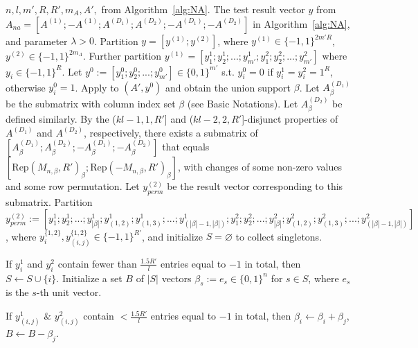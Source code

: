 \documentclass[10pt,a4paper]{amsart}
\begin{document}
\begin{algorithm}
\caption{Non-adaptive scheme of the MLC under Assumption~\ref{Assumption1}: Decoding algorithm}\label{alg:NAdec}
\begin{algorithmic}[1]
    \Require $n,l,m',R,R',m_A,A',$ from Algorithm~\ref{alg:NA}. The test result vector $y$ from $A_{na}=[A^{(1)};-A^{(1)};A^{(D_1)};A^{(D_2)};-A^{(D_1)};-A^{(D_2)}]$ in Algorithm~\ref{alg:NA}, and parameter $\lambda>0$.   
    \State Partition $y=[y^{(1)};y^{(2)}]$, where $y^{(1)}\in\{-1,1\}^{2m'R}$,  $y^{(2)}\in\{-1,1\}^{2m_A}$. Further partition $y^{(1)}=[y_1^1;y_2^1;...;y_{m'}^1;y_1^2;y_2^2;...;y_{m'}^2]$ where $y_i\in \{-1,1\}^R$. Let $y^0:=[y_1^0;y_2^0;...;y_{m'}^0]\in\{0,1\}^{m'}$ s.t. $y_i^0=0$ if $y_i^1=y_i^2=1^R$, otherwise $y_i^0=1$. 
    \State Apply \cite[Algorithm~3]{li2025support} to $(A',y^0)$ and obtain the union support $\beta$. Let $A^{(D_1)}_\beta$ be the submatrix with column index set $\beta$ (see Basic Notations). Let $A^{(D_2)}_\beta$ be defined similarly. 
    \State By the ($kl-1,1,R'$] and ($kl-2,2,R'$]-disjunct properties of $A^{(D_1)}$ and $A^{(D_2)}$, respectively, there exists a submatrix of $[A^{(D_1)}_\beta;A^{(D_2)}_\beta;-A^{(D_1)}_\beta;-A^{(D_2)}_\beta]$ that equals $[\mathrm{Rep}(M_{n,\beta},R')_\beta;\mathrm{Rep}(-M_{n,\beta},R')_\beta]$, with changes of some non-zero values and some row permutation. Let $y^{(2)}_{perm}$ be the result vector corresponding to this submatrix. Partition $y^{(2)}_{perm}:=[y_1^1;y_2^1;...;y_{|\beta|}^1;y_{(1,2)}^1;y_{(1,3)}^1;...;y_{(|\beta|-1,|\beta|)}^1;y_1^2;y_2^2;...;y_{|\beta|}^2;y_{(1,2)}^2;y_{(1,3)}^2;...;y_{(|\beta|-1,|\beta|)}^2]$, where $y_i^{\{1,2\}},y_{(i,j)}^{\{1,2\}}\in \{-1,1\}^{R'}$, and initialize $S=\varnothing$ to collect singletons. 
    \begin{scriptsize}
    \end{scriptsize}
    \State If $y_i^1$ and $y_i^2$ contain fewer than $\frac{1.5R'}{l}$ entries equal to $-1$ in total, then $S\leftarrow S\cup\{i\}$.
    \EndFor
    \State Initialize a set $B$ of $|S|$ vectors $\beta_s:=e_s\in\{0,1\}^n$ for $s\in S$, where $e_s$ is the $s$-th unit vector. 
    \begin{scriptsize}
    \end{scriptsize}
    \State If $y_{(i,j)}^1$ $\&$ $y_{(i,j)}^2$ contain $<\frac{1.5R'}{l}$ entries equal to $-1$ in total, then $\beta_i\leftarrow\beta_i+\beta_j$, $B\leftarrow B-\beta_j$. 

\end{algorithmic}
\end{algorithm}
\end{document}
